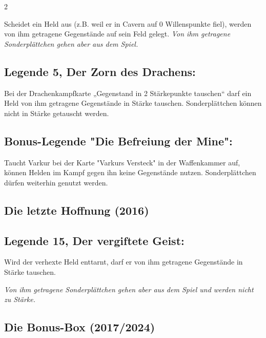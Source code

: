 \documentclass[10pt, a4paper, oneside]{book}
\newcommand{\fan}[1]{\textit{#1}}
\begin{document}
\begin{multicols*}{2}
\begin{bgcolor}
Scheidet ein Held aus (z.B. weil er in Cavern auf 0 Willenspunkte fiel), werden von ihm getragene Gegenstände auf sein Feld gelegt. \fan{Von ihm getragene Sonderplättchen gehen aber aus dem Spiel.}


\subsection{Legende 5, Der Zorn des Drachens:}

Bei der Drachenkampfkarte „Gegenstand in 2 Stärkepunkte tauschen“ darf ein Held von ihm getragene Gegenstände in Stärke tauschen. Sonderplättchen können nicht in Stärke getauscht werden.
\supercite{6952}

\subsection{Bonus-Legende "Die Befreiung der Mine":}

Taucht Varkur bei der Karte "Varkurs Versteck" in der Waffenkammer auf, können Helden im Kampf gegen ihn keine Gegenstände nutzen. Sonderplättchen dürfen weiterhin genutzt werden.
\supercite{6952}



\end{bgcolor}


\begin{bgcolor}
\section{Die letzte Hoffnung (2016)}


\subsection{Legende 15, Der vergiftete Geist:}

Wird der verhexte Held enttarnt, darf er von ihm getragene Gegenstände in Stärke tauschen.
\supercite{dlh15-verhext}

\fan{Von ihm getragene Sonderplättchen gehen aber aus dem Spiel und werden nicht zu Stärke.}

\end{bgcolor}


\begin{bgcolor}[color-bb]
\section{Die Bonus-Box (2017/2024)}


\end{bgcolor}
\end{multicols*}
\end{document}
